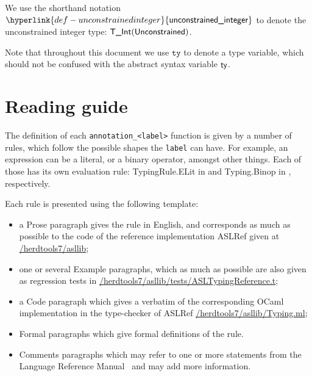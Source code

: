 \documentclass{book}
\newcommand\unconstrainedinteger[0]{\hyperlink{def-unconstrainedinteger}{\textsf{unconstrained\_integer}}}
\newcommand\tty[0]{\texttt{ty}}
\begin{document}
\hypertarget{def-unconstrainedinteger}{}
We use the shorthand notation $\unconstrainedinteger$ to denote the unconstrained integer type: $\textsf{T\_Int}(\textsf{Unconstrained})$.

Note that throughout this document we use $\tty$ to denote a type variable, which should not be confused with the abstract syntax variable $\textsf{ty}$.

\chapter{Reading guide}

The definition of each \texttt{annotation\_<label>} function is given by a number of
rules, which follow the possible shapes the \texttt{label} can have. For
example, an expression can be a literal, or a binary operator, amongst other
things. Each of those has its own evaluation rule: TypingRule.ELit in
 and
Typing.Binop in , respectively.

Each rule is presented using the following template:
\begin{itemize}
\item a Prose paragraph gives the rule in English, and corresponds as much as possible to the code of the reference implementation ASLRef given at
\href{https://github.com/herd/herdtools7//tree/master/asllib}{/herdtools7/asllib};
\item one or several Example paragraphs, which as much as possible are also given as regression tests in
\href{https://github.com/herd/herdtools7//tree/master/asllib/tests/ASLTypingReference.t}{/herdtools7/asllib/tests/ASLTypingReference.t};
\ifcode
\item a Code paragraph which gives a verbatim of the corresponding OCaml implementation in the type-checker of ASLRef
\href{https://github.com/herd/herdtools7//tree/master/asllib/Typing.ml}{/herdtools7/asllib/Typing.ml};
\fi
\item Formal paragraphs which give formal definitions of the rule.
\item Comments paragraphs which may refer to one or more statements from the Language Reference Manual~\cite{LRM}
      and may add more information.
\end{itemize}

\end{document}

